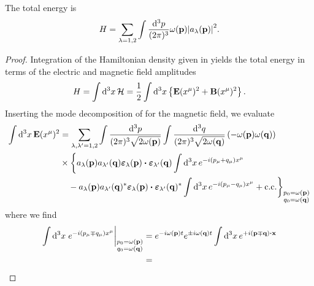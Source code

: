\begin{lemma}\label{thm:mw_coulomb_energy}
	The total energy is
	\begin{equation}
		H
		=
		\sum_{\lambda=1,2}
		\int\frac{\dd[3]{p}}{(2\pi)^3}
		\omega(\vb{p})
		\abs{a_\lambda(\vb{p})}^2
		\label{thm:mw_coulomb_energy}
		.
	\end{equation}
\end{lemma}
\begin{proof}
	Integration of the Hamiltonian density given in  yields the total energy in terms of the electric and magnetic field amplitudes
	\begin{equation*}
		H
		=
		\int\dd[3]{x}
		\mathcal{H}
		=
		\frac{1}{2}
		\int\dd[3]{x}
		\left\{
			\vb{E}(x^\mu)^2
			+
			\vb{B}(x^\mu)^2
		\right\}
		.
	\end{equation*}
	Inserting the mode decomposition of  for the magnetic field, we evaluate
	\begin{equation*}
		\begin{split}
			\int\dd[3]{x}
			\vb{E}(x^\mu)^2
			&=
			\sum_{\lambda,\lambda^\prime=1,2}
			\int\frac{\dd[3]{p}}{(2\pi)^3\sqrt{2\omega(\vb{p})}}
			\int\frac{\dd[3]{q}}{(2\pi)^3\sqrt{2\omega(\vb{q})}}
			\left(
				-
				\omega(\vb{p})
				\omega(\vb{q})
			\right)
			\\
			&\times
			\biggl\{
				a_\lambda(\vb{p})
				a_{\lambda^\prime}(\vb{q})
				\boldsymbol{\varepsilon}_\lambda(\vb{p})
				\vdot
				\boldsymbol{\varepsilon}_{\lambda^\prime}(\vb{q})
				\int\dd[3]{x}
				e^{-i(p_\mu+q_\mu)x^\mu}
				\\
				& \ \ \
				-
				a_\lambda(\vb{p})
				a_{\lambda^\prime}(\vb{q})^*
				\boldsymbol{\varepsilon}_\lambda(\vb{p})
				\vdot
				\boldsymbol{\varepsilon}_{\lambda^\prime}(\vb{q})^*
				\int\dd[3]{x}
				e^{-i(p_\mu-q_\mu)x^\mu}
				+
				\text{c.c.}
			\biggr\}_{\substack{p_0=\omega(\vb{p})\\q_0=\omega(\vb{q})}}
		\end{split}
	\end{equation*}
	where we find
	\begin{equation*}
		\begin{split}
			\int\dd[3]{x}
			\eval{e^{-i(p_\mu\mp q_\mu)x^\mu}}_{\substack{p_0=\omega(\vb{p})\\q_0=\omega(\vb{q})}}
			&=
			e^{-i\omega(\vb{p})t}
			e^{\pm i\omega(\vb{q})t}
			\int\dd[3]{x}
			e^{+i(\vb{p}\mp\vb{q})\vdot\vb{x}}
			\\
			&=

\end{split}
\end{equation*}
\end{proof}

